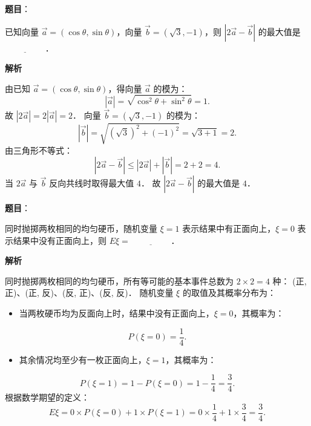 \begin{answer}

\textbf{题目}：

已知向量 $\vec{a} = (\cos\theta, \sin\theta)$，向量 $\vec{b} = (\sqrt{3}, -1)$，则 $|2\vec{a} - \vec{b}|$ 的最大值是 $\underline{\hspace{2cm}}$．

\textbf{解析}

由已知 $\vec{a} = (\cos\theta, \sin\theta)$，得向量 $\vec{a}$ 的模为：
\nopagebreak[4]
\[
|\vec{a}| = \sqrt{\cos^2\theta + \sin^2\theta} = 1.
\]
故 $|2\vec{a}| = 2|\vec{a}| = 2$．
向量 $\vec{b} = (\sqrt{3}, -1)$ 的模为：
\nopagebreak[4]
\[
|\vec{b}| = \sqrt{(\sqrt{3})^2 + (-1)^2} = \sqrt{3 + 1} = 2.
\]
由三角形不等式：
\nopagebreak[4]
\[
|2\vec{a} - \vec{b}| \leqslant |2\vec{a}| + |\vec{b}| = 2 + 2 = 4.
\]
当 $2\vec{a}$ 与 $\vec{b}$ 反向共线时取得最大值 $4$．
故 $|2\vec{a} - \vec{b}|$ 的最大值是 $4$．


\end{answer}
\begin{answer}

\textbf{题目}：

同时抛掷两枚相同的均匀硬币，随机变量 $\xi = 1$ 表示结果中有正面向上，$\xi = 0$ 表示结果中没有正面向上，则 $E\xi = \underline{\hspace{2cm}}$．

\textbf{解析}

同时抛掷两枚相同的均匀硬币，所有等可能的基本事件总数为 $2 \times 2 = 4$ 种：
(正, 正)、(正, 反)、(反, 正)、(反, 反)．
随机变量 $\xi$ 的取值及其概率分布为：
\begin{itemize}
\item 当两枚硬币均为反面向上时，结果中没有正面向上，$\xi = 0$，其概率为：
\end{itemize}
\nopagebreak[4]
\[
P(\xi = 0) = \frac{1}{4}.
\]
\begin{itemize}
\item 其余情况均至少有一枚正面向上，$\xi = 1$，其概率为：
\end{itemize}
\nopagebreak[4]
\[
P(\xi = 1) = 1 - P(\xi = 0) = 1 - \frac{1}{4} = \frac{3}{4}.
\]
根据数学期望的定义：
\nopagebreak[4]
\[
E\xi = 0 \times P(\xi = 0) + 1 \times P(\xi = 1) = 0 \times \frac{1}{4} + 1 \times \frac{3}{4} = \frac{3}{4}.
\]


\end{answer}
